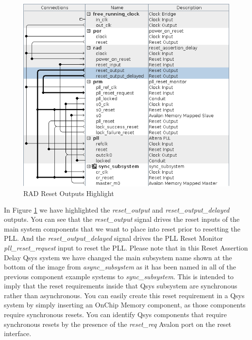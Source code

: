 \documentclass{article}
\begin{document}
\begin{flushleft}
\begin{figure}[H]
\centering
\includegraphics[scale=0.675]{rad_reset_outputs}
\caption{RAD Reset Outputs Highlight}
\label{fig:rad_reset_outputs}
\end{figure}

In Figure \ref{fig:rad_reset_outputs} we have highlighted the \emph{reset\_output} and \emph{reset\_output\_delayed} outputs.  You can see that the \emph{reset\_output} signal drives the reset inputs of the main system components that we want to place into reset prior to resetting the PLL.  And the \emph{reset\_output\_delayed} signal drives the PLL Reset Monitor \emph{pll\_reset\_request} input to reset the PLL.
\newline
\newline
Please note that in this Reset Assertion Delay Qsys system we have changed the main subsystem name shown at the bottom of the image from \emph{async\_subsystem} as it has been named in all of the previous component example systems to \emph{sync\_subsystem}.  This is intended to imply that the reset requirements inside that Qsys subsystem are synchronous rather than asynchronous.  You can easily create this reset requirement in a Qsys system by simply inserting an OnChip Memory component, as those components require synchronous resets.  You can identify Qsys components that require synchronous resets by the presence of the \emph{reset\_req} Avalon port on the reset interface.


\end{flushleft}
\end{document}
